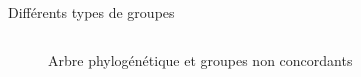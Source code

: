 \documentclass[10pt]{beamer}\usepackage[]{graphicx}\usepackage[]{xcolor}
\begin{document}
\begin{frame}{Différents types de groupes}
\begin{columns}
\begin{column}{0.5\textwidth}
\begin{figure}
            \caption{Arbre phylogénétique et groupes non concordants}
            \label{fig:phylo-non-matching}
        \end{figure}
    \end{column}
\end{columns}

\end{frame}


\end{document}
